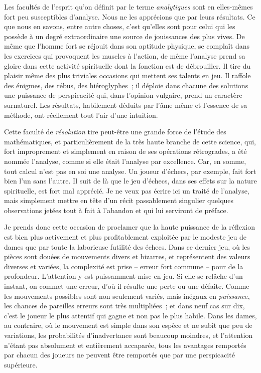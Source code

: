 \documentclass[french,twoside]{book} %
\newcommand{\bibl}[1]{{\RaggedLeft{#1}\par\bigskip}}
\begin{document}
\bibl{Sir Thomas Browne.}
\noindent Les facultés de l’esprit qu’on définit par le terme \emph{analytiques} sont en elles-mêmes fort peu susceptibles d’analyse. Nous ne les apprécions que par leurs résultats. Ce que nous en savons, entre autre choses, c’est qu’elles sont pour celui qui les possède à un degré extraordinaire une source de jouissances des plus vives. De même que l’homme fort se réjouit dans son aptitude physique, se complaît dans les exercices qui provoquent les muscles à l’action, de même l’analyse prend sa gloire dans cette activité spirituelle dont la fonction est de débrouiller. Il tire du plaisir même des plus triviales occasions qui mettent ses talents en jeu. Il raffole des énigmes, des rébus, des hiéroglyphes ; il déploie dans chacune des solutions une puissance de perspicacité qui, dans l’opinion vulgaire, prend un caractère surnaturel. Les résultats, habilement déduits par l’âme même et l’essence de sa méthode, ont réellement tout l’air d’une intuition.\par
Cette faculté de \emph{résolution} tire peut-être une grande force de l’étude des mathématiques, et particulièrement de la très haute branche de cette science, qui, fort improprement et simplement en raison de ses opérations rétrogrades, a été nommée l’analyse, comme si elle était l’analyse par excellence. Car, en somme, tout calcul n’est pas en soi une analyse. Un joueur d’échecs, par exemple, fait fort bien l’un sans l’autre. Il suit de là que le jeu d’échecs, dans ses effets sur la nature spirituelle, est fort mal apprécié. Je ne veux pas écrire ici un traité de l’analyse, mais simplement mettre en tête d’un récit passablement singulier quelques observations jetées tout à fait à l’abandon et qui lui serviront de préface.\par
Je prends donc cette occasion de proclamer que la haute puissance de la réflexion est bien plus activement et plus profitablement exploitée par le modeste jeu de dames que par toute la laborieuse futilité des échecs. Dans ce dernier jeu, où les pièces sont douées de mouvements divers et bizarres, et représentent des valeurs diverses et variées, la complexité est prise – erreur fort commune – pour de la profondeur. L’attention y est puissamment mise en jeu. Si elle se relâche d’un instant, on commet une erreur, d’où il résulte une perte ou une défaite. Comme les mouvements possibles sont non seulement variés, mais inégaux en \emph{puissanc}e, les chances de pareilles erreurs sont très multipliées ; et dans neuf cas sur dix, c’est le joueur le plus attentif qui gagne et non pas le plus habile. Dans les dames, au contraire, où le mouvement est simple dans son espèce et ne subit que peu de variations, les probabilités d’inadvertance sont beaucoup moindres, et l’attention n’étant pas absolument et entièrement accaparée, tous les avantages remportés par chacun des joueurs ne peuvent être remportés que par une perspicacité supérieure.\par
\end{document}
